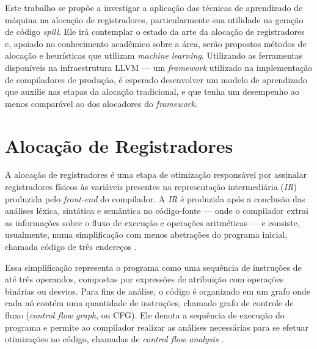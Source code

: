 \documentclass[
	12pt,				%
	openright,			%
	oneside,			%
	a4paper,			%
	tccpreliminar,			%
	]{ABNT-DC-UEL}
\begin{document}
Este trabalho se propõe a investigar a aplicação das técnicas de aprendizado de máquina na alocação de registradores, particularmente sua utilidade na geração de código \textit{spill}. Ele irá contemplar o estado da arte da alocação de registradores e, apoiado no conhecimento acadêmico sobre a área, serão propostos métodos de alocação e heurísticas que utilizam \textit{machine learning}. Utilizando as ferramentas disponíveis na infraestrutura LLVM --- um \textit{framework} utilizado na implementação de compiladores de produção, é esperado desenvolver um modelo de aprendizado que auxilie nas etapas da alocação tradicional, e que tenha um desempenho ao menos comparável ao dos alocadores do \textit{framework}.





% 

\chapter{Alocação de Registradores}

A alocação de registradores é uma etapa de otimização responsável por assinalar registradores físicos às variáveis presentes na representação intermediária (\textit{IR}) produzida pelo \textit{front-end} do compilador. A \textit{IR} é produzida após a conclusão das análises léxica, sintática e semântica no código-fonte --- onde o compilador extrai as informações sobre o fluxo de execução e operações aritméticas --- e consiste, usualmente, numa simplificação com menos abstrações do programa inicial, chamada código de três endereços \cite{aho:07}.

Essa simplificação representa o programa como uma sequência de instruções de até três operandos, compostas por expressões de atribuição com operações binárias ou desvios. Para fins de análise, o código é organizado em um grafo onde cada nó contém uma quantidade de instruções, chamado grafo de controle de fluxo (\textit{control flow graph}, ou CFG). Ele denota a sequência de execução do programa e permite ao compilador realizar as análises necessárias para se efetuar otimizações no código, chamadas de \textit{control flow analysis} \cite{allen:70}.
\end{document}
